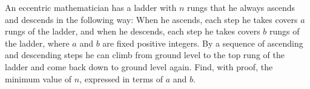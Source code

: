 An eccentric mathematician has a ladder with $n$ rungs that he always ascends and descends in the following way: When he ascends, each step he takes covers $a$ rungs of the ladder, and when he descends, each step he takes covers $b$ rungs of the ladder, where $a$ and $b$ are fixed positive integers. By a sequence of ascending and descending steps he can climb from ground level to the top rung of the ladder and come back down to ground level again. Find, with proof, the minimum value of $n$, expressed in terms of $a$ and $b$.
